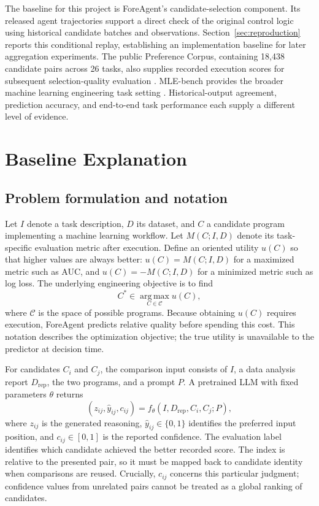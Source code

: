 \documentclass{article}
\begin{document}
The baseline for this project is ForeAgent's candidate-selection component. Its released agent trajectories support a direct check of the original control logic using historical candidate batches and observations. Section~\ref{sec:reproduction} reports this conditional replay, establishing an implementation baseline for later aggregation experiments. The public Preference Corpus, containing 18,438 candidate pairs across 26 tasks, also supplies recorded execution scores for subsequent selection-quality evaluation \citep{zheng2026predict}. MLE-bench provides the broader machine learning engineering task setting \citep{chan2024mle}. Historical-output agreement, prediction accuracy, and end-to-end task performance each supply a different level of evidence.

\section{Baseline Explanation}

\subsection{Problem formulation and notation}

Let $I$ denote a task description, $D$ its dataset, and $C$ a candidate program implementing a machine learning workflow. Let $M(C;I,D)$ denote its task-specific evaluation metric after execution. Define an oriented utility $u(C)$ so that higher values are always better: $u(C)=M(C;I,D)$ for a maximized metric such as AUC, and $u(C)=-M(C;I,D)$ for a minimized metric such as log loss. The underlying engineering objective is to find
\begin{equation}
  C^* \in \operatorname*{arg\,max}_{C\in\mathcal{C}} u(C),
  \label{eq:objective}
\end{equation}
where $\mathcal{C}$ is the space of possible programs. Because obtaining $u(C)$ requires execution, ForeAgent predicts relative quality before spending this cost. This notation describes the optimization objective; the true utility is unavailable to the predictor at decision time.

For candidates $C_i$ and $C_j$, the comparison input consists of $I$, a data analysis report $D_{\mathrm{rep}}$, the two programs, and a prompt $P$. A pretrained LLM with fixed parameters $\theta$ returns
\begin{equation}
  (z_{ij},\widehat{y}_{ij},c_{ij})
  = f_{\theta}(I,D_{\mathrm{rep}},C_i,C_j;P),
  \label{eq:predictor}
\end{equation}
where $z_{ij}$ is the generated reasoning, $\widehat{y}_{ij}\in\{0,1\}$ identifies the preferred input position, and $c_{ij}\in[0,1]$ is the reported confidence. The evaluation label identifies which candidate achieved the better recorded score. The index is relative to the presented pair, so it must be mapped back to candidate identity when comparisons are reused. Crucially, $c_{ij}$ concerns this particular judgment; confidence values from unrelated pairs cannot be treated as a global ranking of candidates.
\end{document}
